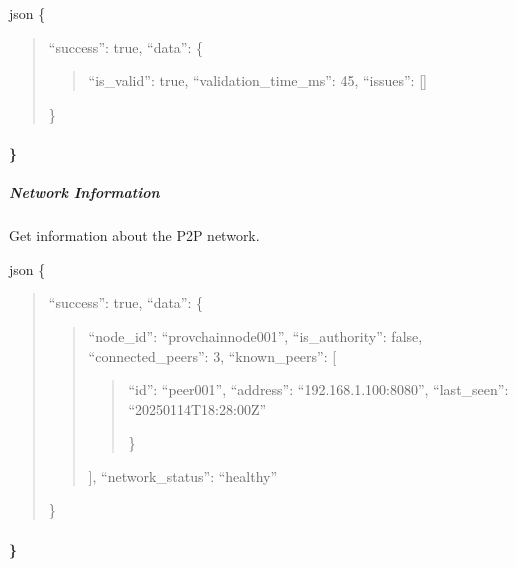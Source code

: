\documentclass[letterpaper,10pt,english]{sphinxmanual}
\begin{document}
\sphinxAtStartPar
{}
{\color{red}\bfseries{}\textasciigrave{}\textasciigrave{}}{\color{red}\bfseries{}\textasciigrave{}}json
\{
\begin{quote}

\sphinxAtStartPar
“success”: true,
“data”: \{
\begin{quote}

\sphinxAtStartPar
“is\_valid”: true,
“validation\_time\_ms”: 45,
“issues”: {[}{]}
\end{quote}

\sphinxAtStartPar
\}
\end{quote}


\paragraph{\}}
\label{\detokenize{api/rest-api:id79}}

\subparagraph{Network Information}
\label{\detokenize{api/rest-api:network-information}}
\sphinxAtStartPar
Get information about the P2P network.

\sphinxAtStartPar
{} 

\sphinxAtStartPar
{}
{\color{red}\bfseries{}\textasciigrave{}\textasciigrave{}}{\color{red}\bfseries{}\textasciigrave{}}json
\{
\begin{quote}

\sphinxAtStartPar
“success”: true,
“data”: \{
\begin{quote}

\sphinxAtStartPar
“node\_id”: “provchain\sphinxhyphen{}node\sphinxhyphen{}001”,
“is\_authority”: false,
“connected\_peers”: 3,
“known\_peers”: {[}
\begin{quote}
\begin{description}
\sphinxlineitem{\{}
\sphinxAtStartPar
“id”: “peer\sphinxhyphen{}001”,
“address”: “192.168.1.100:8080”,
“last\_seen”: “2025\sphinxhyphen{}01\sphinxhyphen{}14T18:28:00Z”

\end{description}

\sphinxAtStartPar
\}
\end{quote}

\sphinxAtStartPar
{]},
“network\_status”: “healthy”
\end{quote}

\sphinxAtStartPar
\}
\end{quote}


\paragraph{\}}
\label{\detokenize{api/rest-api:id84}}
\end{document}
